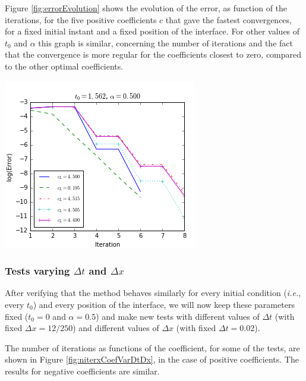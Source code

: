 \addtocounter{figure}{-1}
\endgroup

\indent Figure \ref{fig:errorEvolution} shows the evolution of the error, as function of the iterations, for the five positive coefficients $c$ that gave the fastest convergences, for a fixed initial instant and a fixed position of the interface. For other values of $t_0$ and $\alpha$ this graph is similar, concerning the number of iterations and the fact that the convergence is more regular for the coefficients closest to zero, compared to the other optimal coefficients.

\begingroup
\begin{center}
\includegraphics[scale=.5]{Fig4.png}
\end{center}
\endgroup

\subsubsection{Tests varying $\Delta t$ and $\Delta x$}

\indent After verifying that the method behaves similarly for every initial condition (\emph{i.e.}, every $t_0$) and every position of the interface, we will now keep these parameters fixed ($t_0 = 0$ and $\alpha = 0.5$) and make new tests with different values of $\Delta t$ (with fixed $\Delta x = 12/250$) and different values of $\Delta x$ (with fixed $\Delta t = 0.02$).

\indent The number of iterations as functions of the coefficient, for some of the tests, are shown in Figure \ref{fig:niterxCoefVarDtDx}, in the case of positive coefficients. The results for negative coefficients are similar.

